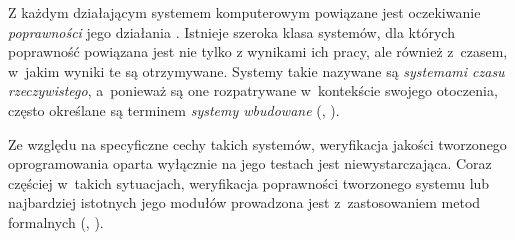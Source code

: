 \documentclass[11pt,a4paper]{article}
\begin{document}
Z każdym działającym systemem komputerowym powiązane jest oczekiwanie 
{\em poprawności} jego działania \cite{Sommerville:2006:SE:1196763}. Istnieje szeroka 
klasa systemów, dla których poprawność powiązana jest nie tylko z 
wynikami ich pracy, ale również z~czasem, w~jakim wyniki te są 
otrzymywane. Systemy takie nazywane są {\em systemami czasu 
rzeczywistego}, a~ponieważ są one rozpatrywane  w~kontekście swojego 
otoczenia, często określane są terminem {\em systemy wbudowane} 
(\cite{Sommerville:2006:SE:1196763}, \cite{etykietaMetody}). 

Ze względu na specyficzne cechy takich systemów, weryfikacja jakości 
tworzonego oprogramowania oparta wyłącznie na jego testach jest 
niewystarczająca. Coraz częściej w~takich sytuacjach, weryfikacja 
poprawności tworzonego systemu lub najbardziej istotnych jego 
modułów prowadzona jest z~zastosowaniem metod formalnych 
(\cite{Alur:1990:AMR:90397.90438}, \cite{etykietaMetody}). 

\end{document}
